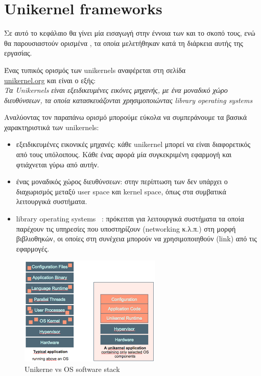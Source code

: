 \chapter{Unikernel frameworks}
\label{chap:unikernels}

Σε αυτό το κεφάλαιο θα γίνει μία εισαγωγή στην έννοια των  και το
σκοπό τους, ενώ θα παρουσιαστούν ορισμένα , τα οποία
μελετήθηκαν κατά τη διάρκεια αυτής της εργασίας. 

Ένας τυπικός ορισμός των unikernels αναφέρεται στη σελίδα \\
\href{http://unikernel.org/}{unikernel.org} και είναι ο εξής: 
\vspace{1ex}
\\
\textit{Τα Unikernels είναι εξειδικευμένες εικόνες μηχανής, με ένα
μοναδικό χώρο διευθύνσεων, τα οποία κατασκευάζονται χρησιμοποιώντας library
operating systems} \\
\vspace{1ex}

Αναλύοντας τον παραπάνω ορισμό μπορούμε εύκολα να συμπεράνουμε τα βασικά
χαρακτηριστικά των unikernels:
\begin{itemize}
	\item εξειδικευμένες εικονικές μηχανές: κάθε unikernel μπορεί να είναι
	διαφορετικός από τους υπόλοιπους. Κάθε ένας αφορά μία συγκεκριμένη
		εφαρμογή και φτιάχνεται γύρω από αυτήν.
	\item ένας μοναδικός χώρος διευθύνσεων: στην περίπτωση των 
		δεν υπάρχει ο διαχωρισμός μεταξύ user space και kernel space, όπως
		στα συμβατικά λειτουργικά συστήματα.
	\item library operating systems ~\cite{porter2011rethinking}: πρόκειται
		για λειτουργικά συστήματα τα οποία παρέχουν τις υπηρεσίες που
		υποστηρίζουν (networking κ.λ.π.) στη μορφή βιβλιοθηκών, οι
		οποίες στη συνέχεια μπορούν να χρησιμοποιηθούν (link) από τις
		εφαρμογές. 
\end{itemize}

\begin{figure}[htp]
\centering
\includegraphics[scale=1]{figures/unikernel_vs_os.png}
\caption{Unikerne vs OS software stack\label{fig3_1}}
\end{figure}

